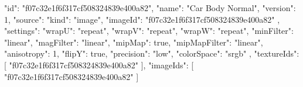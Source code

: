 {
  "id": "f07c32e1f6f317cf508324839e400a82",
  "name": "Car Body Normal",
  "version": 1,
  "source": {
    "kind": "image",
    "imageId": "f07c32e1f6f317cf508324839e400a82"
  },
  "settings": {
    "wrapU": "repeat",
    "wrapV": "repeat",
    "wrapW": "repeat",
    "minFilter": "linear",
    "magFilter": "linear",
    "mipMap": true,
    "mipMapFilter": "linear",
    "anisotropy": 1,
    "flipY": true,
    "precision": "low",
    "colorSpace": "srgb"
  },
  "textureIds": [
    "f07c32e1f6f317cf508324839e400a82"
  ],
  "imageIds": [
    "f07c32e1f6f317cf508324839e400a82"
  ]
}
